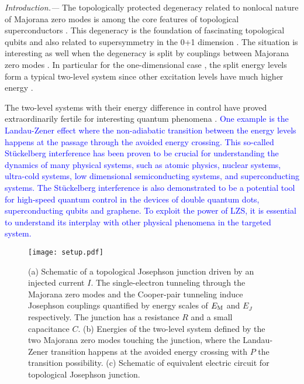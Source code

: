 \documentclass[aps,prl,twocolumn,showpacs,showpacs,10pt,superscriptaddress]{revtex4-1}
\newcommand{\blue}[1]{\textcolor{blue}{#1}}
\begin{document}
{\it Introduction.---}
The topologically protected degeneracy related to nonlocal nature of Majorana zero modes is among the core features of topological superconductors \cite{kitaev01,kitaevaip,zhangrmp}. This degeneracy is the foundation of fascinating topological qubits \cite{fu08,sato09,Tanaka09,sauprl10,alicea12,beenakker13,franzrmp,aliceaprx,aguadoreview} and also related to supersymmetry in the 0+1 dimension \cite{Qi09,Hsieh16,Huang17}. The situation is interesting as well when the degeneracy is split by couplings between Majorana zero modes \cite{beenakker08, Cheng09, Muzushima10,tewarijpcm,marcus16}. In particular for the one-dimensional case \cite{fuprb09,Lutchyn10,oregprl10,Mourik12,Deng12}, the split energy levels form a typical two-level system since other excitation levels have much higher energy \cite{alicea12,Platero12,aguado11}.



The two-level systems with their energy difference in control have proved extraordinarily fertile for interesting quantum phenomena \cite{AllenBook,Chuang05,Morsch06,noripr}. \blue{One example is the Landau-Zener effect where the non-adiabatic transition between the energy levels happens at the passage through the avoided energy crossing. This so-called St\"{u}ckelberg interference has been proven to be crucial for understanding the dynamics of many physical systems, such as atomic physics, nuclear systems, ultra-cold systems, low dimensional semiconducting systems, and superconducting systems. The St\"{u}ckelberg interference is also demonstrated to be a potential tool for high-speed quantum control in the devices of double quantum dots, superconducting qubits and graphene. To exploit the power of LZS, it is essential to understand its interplay with other physical phenomena in the targeted system. }


\begin{figure}[b]
\begin{center}
\texttt{[image: setup.pdf]}
\caption{(a) Schematic of a topological Josephson junction driven by an injected current $I$. The single-electron tunneling through the Majorana zero modes and the Cooper-pair tunneling induce Josephson couplings quantified by energy scales of $E_{\rm M}$ and $E_J$ respectively. The junction has a resistance $R$ and a small capacitance $C$. (b) Energies of the two-level system defined by the two Majorana zero modes touching the junction, where the Landau-Zener transition happens at the avoided energy crossing with $P$ the transition possibility. (c) Schematic of equivalent electric circuit for topological Josephson junction.}
\label{fig:setup}
\end{center}
\end{figure}
\end{document}

